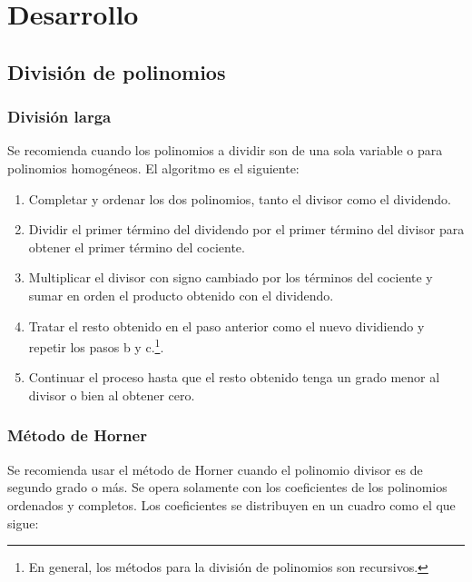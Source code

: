 \section{Desarrollo}

\subsection{División de polinomios}

\subsubsection{División larga}
Se recomienda cuando los polinomios a dividir son de una sola variable o para polinomios homogéneos.
El algoritmo es el siguiente:

\begin{enumerate}
    \item Completar y ordenar los dos polinomios, tanto el divisor como el dividendo.
    \item Dividir el primer término del dividendo por el primer término del divisor para obtener el primer término del cociente.
    \item Multiplicar el divisor con signo cambiado por los términos del cociente y sumar en orden el producto obtenido con el dividendo.
    \item Tratar el resto obtenido en el paso anterior como el nuevo dividiendo y repetir los pasos b y c.\footnote{En general, los métodos para la división de polinomios son recursivos.}.
    \item Continuar el proceso hasta que el resto obtenido tenga un grado menor al divisor o bien al obtener cero.
\end{enumerate}



\subsubsection{Método de Horner}

Se recomienda usar el método de Horner cuando el polinomio divisor es de segundo grado o más.
Se opera solamente con los coeficientes de los polinomios ordenados y completos.
Los coeficientes se distribuyen en un cuadro como el que sigue:
\begin{figure}[htb]
    \centering
\end{figure}

